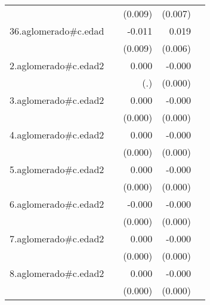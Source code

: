 {\begin{longtable}{l*{4}{D{.}{.}{-1}}}
            &                     &     (0.009)         &     (0.007)         &                     \\
\addlinespace
36.aglomerado#c.edad&                     &      -0.011         &       0.019\sym{***}&                     \\
            &                     &     (0.009)         &     (0.006)         &                     \\
\addlinespace
2.aglomerado#c.edad2&                     &       0.000         &      -0.000\sym{**} &                     \\
            &                     &         (.)         &     (0.000)         &                     \\
\addlinespace
3.aglomerado#c.edad2&                     &       0.000         &      -0.000\sym{**} &                     \\
            &                     &     (0.000)         &     (0.000)         &                     \\
\addlinespace
4.aglomerado#c.edad2&                     &       0.000         &      -0.000         &                     \\
            &                     &     (0.000)         &     (0.000)         &                     \\
\addlinespace
5.aglomerado#c.edad2&                     &       0.000\sym{*}  &      -0.000         &                     \\
            &                     &     (0.000)         &     (0.000)         &                     \\
\addlinespace
6.aglomerado#c.edad2&                     &      -0.000         &      -0.000\sym{***}&                     \\
            &                     &     (0.000)         &     (0.000)         &                     \\
\addlinespace
7.aglomerado#c.edad2&                     &       0.000         &      -0.000\sym{**} &                     \\
            &                     &     (0.000)         &     (0.000)         &                     \\
\addlinespace
8.aglomerado#c.edad2&                     &       0.000         &      -0.000         &                     \\
            &                     &     (0.000)         &     (0.000)         &                     \\

\end{longtable}}
